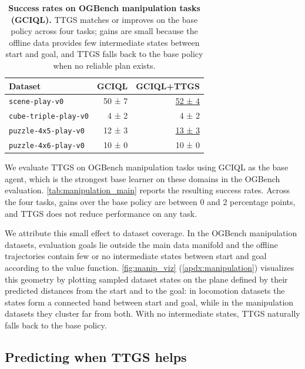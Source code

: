 \documentclass{article} %
\begin{document}
\begin{table}[t]
  \centering
  \small
    \caption{\textbf{Success rates on OGBench manipulation tasks (GCIQL).} TTGS matches or improves on the base policy across four tasks; gains are small because the offline data provides few intermediate states between start and goal, and TTGS falls back to the base policy when no reliable plan exists.}
  \label{tab:manipulation_main}
  \begin{tabular*}{1\linewidth}{@{\extracolsep{\fill}}lrr}
    \toprule
    Dataset        & GCIQL & GCIQL+TTGS \\
    \midrule
    \texttt{scene-play-v0}         & 50 ± 7   & \underline{52 ± 4} \\
    \texttt{cube-triple-play-v0}   & 4 ± 2    & 4 ± 2  \\
    \texttt{puzzle-4x5-play-v0}    & 12 ± 3   & \underline{13 ± 3} \\
    \texttt{puzzle-4x6-play-v0}    & 10 ± 0   & 10 ± 0 \\
    \bottomrule
  \end{tabular*}
  \vskip -0.1in
\end{table}

We evaluate TTGS on OGBench manipulation tasks using GCIQL as the base agent, which is the strongest base learner on these domains in the OGBench evaluation. \autoref{tab:manipulation_main} reports the resulting success rates. Across the four tasks, gains over the base policy are between 0 and 2 percentage points, and TTGS does not reduce performance on any task.

We attribute this small effect to dataset coverage. In the OGBench manipulation datasets, evaluation goals lie outside the main data manifold and the offline trajectories contain few or no intermediate states between start and goal according to the value function. \autoref{fig:manip_viz} (\autoref{apdx:manipulation}) visualizes this geometry by plotting sampled dataset states on the plane defined by their predicted distances from the start and to the goal: in locomotion datasets the states form a connected band between start and goal, while in the manipulation datasets they cluster far from both. With no intermediate states, TTGS naturally falls back to the base policy.


\subsection{Predicting when TTGS helps}\label{subsec:hopratio}
\end{document}
